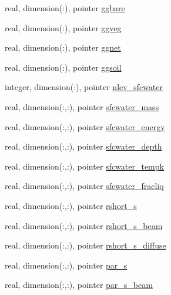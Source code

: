 \begin{DoxyCompactItemize}
\item 
real, dimension(\+:), pointer \hyperlink{structed__state__vars_1_1sitetype_a3c3068e1f622ad81f1448f4f5149559d}{ggbare}
\item 
real, dimension(\+:), pointer \hyperlink{structed__state__vars_1_1sitetype_abd17bd8d26151daf7a63f71cfe63b294}{ggveg}
\item 
real, dimension(\+:), pointer \hyperlink{structed__state__vars_1_1sitetype_a0fcfdbce4b98d1815c2b35c46c18a1e9}{ggnet}
\item 
real, dimension(\+:), pointer \hyperlink{structed__state__vars_1_1sitetype_a858442cd29ff335c104915966330dbb4}{ggsoil}
\item 
integer, dimension(\+:), pointer \hyperlink{structed__state__vars_1_1sitetype_a9da494bbe974c078af56fc08955dddd8}{nlev\+\_\+sfcwater}
\item 
real, dimension(\+:,\+:), pointer \hyperlink{structed__state__vars_1_1sitetype_aa913fd667de91e7b706988b6c9b295be}{sfcwater\+\_\+mass}
\item 
real, dimension(\+:,\+:), pointer \hyperlink{structed__state__vars_1_1sitetype_ab093400ec81cec0dd4604f51aaf7aa5c}{sfcwater\+\_\+energy}
\item 
real, dimension(\+:,\+:), pointer \hyperlink{structed__state__vars_1_1sitetype_aab083d829b634de0d8656e0c7642e197}{sfcwater\+\_\+depth}
\item 
real, dimension(\+:,\+:), pointer \hyperlink{structed__state__vars_1_1sitetype_a20afeefd511f7e96170b06fb7853e95e}{sfcwater\+\_\+tempk}
\item 
real, dimension(\+:,\+:), pointer \hyperlink{structed__state__vars_1_1sitetype_a35a30a665608f28111930dbbd107fcfb}{sfcwater\+\_\+fracliq}
\item 
real, dimension(\+:,\+:), pointer \hyperlink{structed__state__vars_1_1sitetype_aa6d3d54cd2217838d6af70b0f27fe53e}{rshort\+\_\+s}
\item 
real, dimension(\+:,\+:), pointer \hyperlink{structed__state__vars_1_1sitetype_a11dabbe57c3dd4022dce161fde6c6867}{rshort\+\_\+s\+\_\+beam}
\item 
real, dimension(\+:,\+:), pointer \hyperlink{structed__state__vars_1_1sitetype_a1a69537f27b07feec855abfcebaaf624}{rshort\+\_\+s\+\_\+diffuse}
\item 
real, dimension(\+:,\+:), pointer \hyperlink{structed__state__vars_1_1sitetype_adbfa29081f67f5ec6b7206aed85900f6}{par\+\_\+s}
\item 
real, dimension(\+:,\+:), pointer \hyperlink{structed__state__vars_1_1sitetype_af04a6b6bb015712d0531af02b62548f6}{par\+\_\+s\+\_\+beam}

\end{DoxyCompactItemize}
